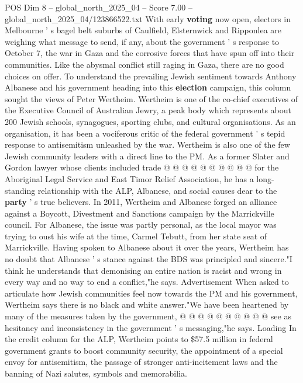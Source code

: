 \begin{textsample}{POS Dim 8 – global\_north\_2025\_04 – Score 7.00 – global\_north\_2025\_04/123866522.txt}  \label{ex:f8_pos_373}
With early \textbf{voting} now open, electors in Melbourne ' s bagel belt suburbs of Caulfield, Elsternwick and Ripponlea are weighing what message to send, if any, about the government ' s response to October 7, the war in Gaza and the corrosive forces that have spun off into their communities.
Like the abysmal conflict still raging in Gaza, there are no good choices on offer.
To understand the prevailing Jewish sentiment towards Anthony Albanese and his government heading into this \textbf{election} campaign, this column sought the views of Peter Wertheim.
Wertheim is one of the co-chief executives of the Executive Council of Australian Jewry, a peak body which represents about 200 Jewish schools, synagogues, sporting clubs, and cultural organisations.
As an organisation, it has been a vociferous critic of the federal government ' s tepid response to antisemitism unleashed by the war.
Wertheim is also one of the few Jewish community leaders with a direct line to the PM.
As a former Slater and Gordon lawyer whose clients included trade @ @ @ @ @ @ @ @ @ @ for the Aboriginal Legal Service and East Timor Relief Association, he has a long-standing relationship with the ALP, Albanese, and social causes dear to the \textbf{party} ' s true believers.
In 2011, Wertheim and Albanese forged an alliance against a Boycott, Divestment and Sanctions campaign by the Marrickville council.
For Albanese, the issue was partly personal, as the local mayor was trying to oust his wife at the time, Carmel Tebutt, from her state seat of Marrickville.
Having spoken to Albanese about it over the years, Wertheim has no doubt that Albanese ' s stance against the BDS was principled and sincere."I think he understands that demonising an entire nation is racist and wrong in every way and no way to end a conflict,"he says.
Advertisement When asked to articulate how Jewish communities feel now towards the PM and his government, Wertheim says there is no black and white answer."We have been heartened by many of the measures taken by the government, @ @ @ @ @ @ @ @ @ @ see as hesitancy and inconsistency in the government ' s messaging,"he says.
Loading In the credit column for the ALP, Wertheim points to \$57.5 million in federal government grants to boost community security, the appointment of a special envoy for antisemitism, the passage of stronger anti-incitement laws and the banning of Nazi salutes, symbols and memorabilia.

\end{textsample}
